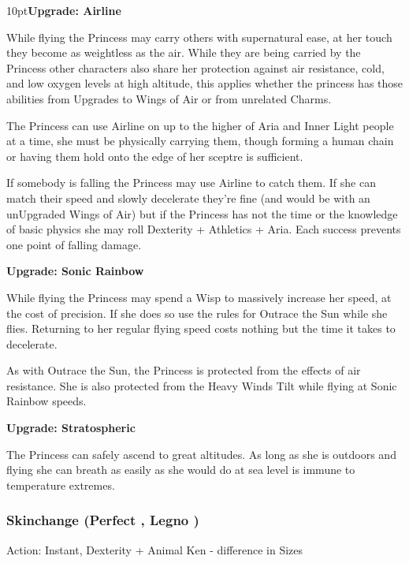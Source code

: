 \begin{myindentpar}{10pt}\textbf{Upgrade: Airline}

While flying the Princess may carry others with supernatural ease, at her touch they become as weightless as the air. While they are being carried by the Princess other characters also share her protection against air resistance, cold, and low oxygen levels at high altitude, this applies whether the princess has those abilities from Upgrades to Wings of Air or from unrelated Charms.

The Princess can use Airline on up to the higher of Aria and Inner Light people at a time, she must be physically carrying them, though forming a human chain or having them hold onto the edge of her sceptre is sufficient. 

If somebody is falling the Princess may use Airline to catch them. If she can match their speed and slowly decelerate they're fine (and would be with an unUpgraded Wings of Air) but if the Princess has not the time or the knowledge of basic physics she may roll Dexterity + Athletics + Aria. Each success prevents one point of falling damage. 

\textbf{Upgrade: Sonic Rainbow}

While flying the Princess may spend a Wisp to massively increase her speed, at the cost of precision. If she does so use the rules for Outrace the Sun while she flies. Returning to her regular flying speed costs nothing but the time it takes to decelerate.

As with Outrace the Sun, the Princess is protected from the effects of air resistance. She is also protected from the Heavy Winds Tilt while flying at Sonic Rainbow speeds. 

\textbf{Upgrade: Stratospheric}

The Princess can safely ascend to great altitudes. As long as she is outdoors and flying she can breath as easily as she would do at sea level is immune to temperature extremes. 

\end{myindentpar}

\subsubsection*{Skinchange (Perfect \textbullet\textbullet\textbullet\textbullet, Legno  \textbullet\textbullet\textbullet)}

\noindent Action: Instant, Dexterity + Animal Ken - difference in Sizes

